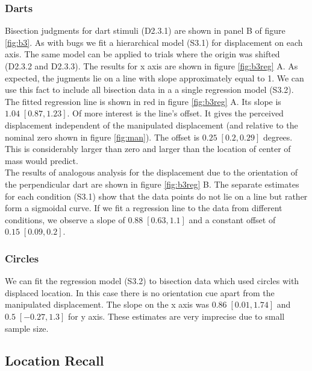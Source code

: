 \documentclass[10pt]{article}
\begin{document}
\subsubsection*{Darts}
Bisection judgments for dart stimuli (D2.3.1) are shown in panel B of figure \ref{fig:b3}. 
As with bugs we fit a hierarchical model (S3.1) for displacement on each axis. 
The same model can be applied to trials where the origin was shifted (D2.3.2 and D2.3.3). The results for x axis are shown in figure \ref{fig:b3reg} A. 
As expected, the jugments lie on a line with slope approximately equal to 1. 
We can use this fact to include all bisection data in a a single regression model (S3.2). 
The fitted regression line is shown in red in figure \ref{fig:b3reg} A. Its slope is $1.04\; [0.87,1.23]$. 
Of more interest is the line's offset.
It gives the perceived displacement independent of the manipulated displacement (and relative to the nominal zero shown in figure \ref{fig:man}). 
The offset is $0.25\; [0.2,0.29]$ degrees. 
This is considerably larger than zero and larger than the location of center of mass would predict. 
\\
The results of analogous analysis for the displacement due to the orientation of the perpendicular dart are shown in figure \ref{fig:b3reg} B. 
The separate estimates for each condition (S3.1) show that the data points do not lie on a line but rather form a sigmoidal curve. 
If we fit a regression line to the data from different conditions, we observe a slope of $0.88\; [0.63,1.1]$ and a constant offset of $0.15\; [0.09,0.2]$.

\subsubsection*{Circles}
We can fit the regression model (S3.2) to bisection data which used circles with displaced location. 
In this case there is no orientation cue apart from the manipulated displacement. 
The slope on the x axis was $0.86\; [0.01,1.74]$ and $0.5 \;[-0.27,1.3]$ for y axis. These estimates are very imprecise due to small sample size.  

\subsection*{Location Recall} 
\end{document}
